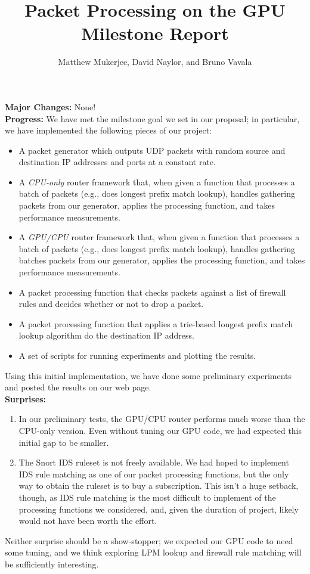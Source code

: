 \documentclass[12pt]{article}
\title{Packet Processing on the GPU\\\small{Milestone Report}}
\author{Matthew Mukerjee, David Naylor, and Bruno Vavala}
\date{} %
\begin{document}
\maketitle

\noindent \textbf{Major Changes:} None!\\

\noindent \textbf{Progress:} We have met the milestone goal we set in our proposal; in particular, we have implemented the following pieces of our project:
\begin{itemize}
	\item A packet generator which outputs UDP packets with random source and destination IP addresses and ports at a constant rate.
	
	\item A \emph{CPU-only} router framework that, when given a function that processes a batch of packets (e.g., does longest prefix match lookup), handles gathering packets from our generator, applies the processing function, and takes performance measurements.
	
	\item A \emph{GPU/CPU} router framework that, when given a function that processes a batch of packets (e.g., does longest prefix match lookup), handles gathering batches packets from our generator, applies the processing function, and takes performance measurements.
	
	\item A packet processing function that checks packets against a list of firewall rules and decides whether or not to drop a packet.
	
	\item A packet processing function that applies a trie-based longest prefix match lookup algorithm do the destination IP address.
	
	\item A set of scripts for running experiments and plotting the results.
\end{itemize}
Using this initial implementation, we have done some preliminary experiments and posted the results on our web page.\\


\noindent \textbf{Surprises:}
\begin{enumerate}
	\item In our preliminary tests, the GPU/CPU router performs much worse than the CPU-only version. Even without tuning our GPU code, we had expected this initial gap to be smaller.

	\item The Snort IDS ruleset is not freely available. We had hoped to implement IDS rule matching as one of our packet processing functions, but the only way to obtain the ruleset is to buy a subscription. This isn't a huge setback, though, as IDS rule matching is the most difficult to implement of the processing functions we considered, and, given the duration of project, likely would not have been worth the effort.
\end{enumerate}
Neither surprise should be a show-stopper; we expected our GPU code to need some tuning, and we think exploring LPM lookup and firewall rule matching will be sufficiently interesting.\\
\end{document}
